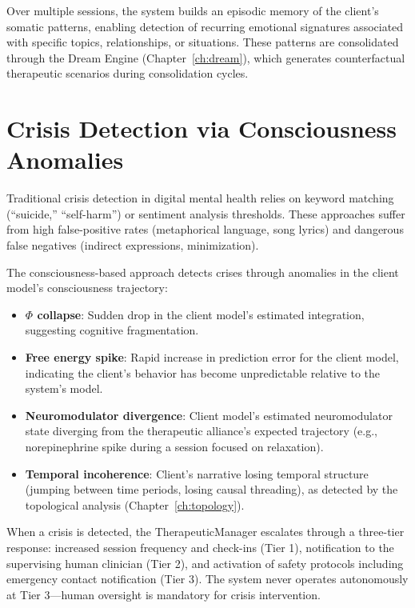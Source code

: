 \documentclass[12pt]{book}
\begin{document}
Over multiple sessions, the system builds an episodic memory of the client's somatic patterns, enabling detection of recurring emotional signatures associated with specific topics, relationships, or situations. These patterns are consolidated through the Dream Engine (Chapter~\ref{ch:dream}), which generates counterfactual therapeutic scenarios during consolidation cycles.

\section{Crisis Detection via Consciousness Anomalies}

Traditional crisis detection in digital mental health relies on keyword matching (``suicide,'' ``self-harm'') or sentiment analysis thresholds. These approaches suffer from high false-positive rates (metaphorical language, song lyrics) and dangerous false negatives (indirect expressions, minimization).

The consciousness-based approach detects crises through anomalies in the client model's consciousness trajectory:
\begin{itemize}
  \item \textbf{$\Phi$ collapse}: Sudden drop in the client model's estimated integration, suggesting cognitive fragmentation.
  \item \textbf{Free energy spike}: Rapid increase in prediction error for the client model, indicating the client's behavior has become unpredictable relative to the system's model.
  \item \textbf{Neuromodulator divergence}: Client model's estimated neuromodulator state diverging from the therapeutic alliance's expected trajectory (e.g., norepinephrine spike during a session focused on relaxation).
  \item \textbf{Temporal incoherence}: Client's narrative losing temporal structure (jumping between time periods, losing causal threading), as detected by the topological analysis (Chapter~\ref{ch:topology}).
\end{itemize}

When a crisis is detected, the TherapeuticManager escalates through a three-tier response: increased session frequency and check-ins (Tier 1), notification to the supervising human clinician (Tier 2), and activation of safety protocols including emergency contact notification (Tier 3). The system never operates autonomously at Tier 3---human oversight is mandatory for crisis intervention.
\end{document}
